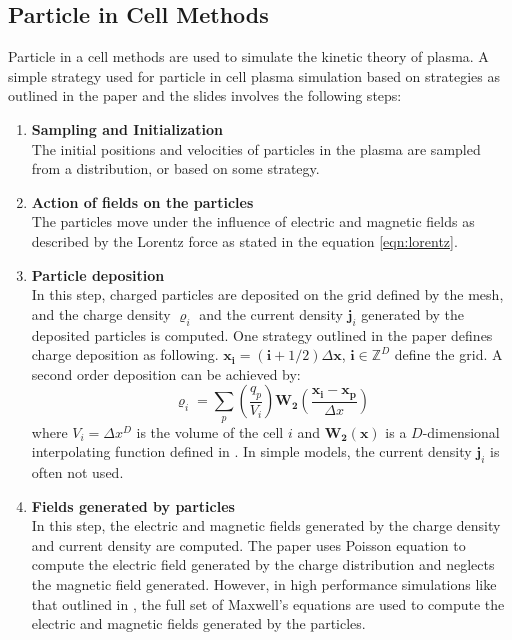 \documentclass[12pt]{article}
\begin{document}
	\subsection{Particle in Cell Methods}
	Particle in a cell methods are used to simulate the kinetic theory of plasma. A simple strategy used for particle in cell plasma simulation based on strategies as outlined in the paper \cite{PIC good} and the slides \cite{PIC IAS} involves the following steps:
	\begin{enumerate}
		\item \textbf{Sampling and Initialization} \\
		The initial positions and velocities of particles in the plasma are sampled from a distribution, or based on some strategy.
		\item \textbf{Action of fields on the particles} \\
		The particles move under the influence of electric and magnetic fields as described by the Lorentz force as stated in the equation \eqref{eqn:lorentz}.
		\item \textbf{Particle deposition} \\
		In this step, charged particles are deposited on the grid defined by the mesh, and the charge density $\varrho_{i}$ and the current density $\boldsymbol{j}_{i}$ generated by the deposited particles is computed. One strategy outlined in the paper \cite{PIC good} defines charge deposition as following.
		$\boldsymbol{x_{i}} = \left(\boldsymbol{i} + 1/2\right) \Delta \boldsymbol{x}$, $\boldsymbol{i} \in \mathbb{Z}^{D}$ define the grid. A second order deposition can be achieved by:
		$$\varrho_{i} = \sum_{p}^{}\left(\frac{q_{p}}{V_{i}}\right) \mathbf{W_{2}} \left(\frac{\boldsymbol{x_{i}} - \boldsymbol{x_{p}}}{\Delta x}\right)$$
		where $V_{i} = \Delta x^{D}$ is the volume of the cell $i$ and $\mathbf{W_{2}}\left(\boldsymbol{x}\right)$ is a $D$-dimensional interpolating function defined in \cite{PIC good}. In simple models, the current density $\boldsymbol{j}_{i}$ is often not used.
		\item \textbf{Fields generated by particles} \\
		In this step, the electric and magnetic fields generated by the charge density and current density are computed. The paper \cite{PIC good} uses Poisson equation to compute the electric field generated by the charge distribution and neglects the magnetic field generated. However, in high performance simulations like that outlined in \cite{PIC IAS}, the full set of Maxwell's equations are used to compute the electric and magnetic fields generated by the particles.

\end{enumerate}
\end{document}
